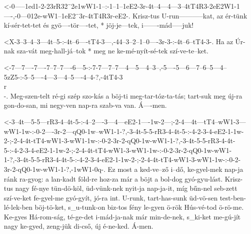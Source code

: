 



  {<-0-----1ed1-2-23rR32¨2e1wW1-1--:-1--1--1eE2-3r-4t--4---4---3--4tT4R3-2eE2W1-1----,-0---012e-wW1--1eE2¨3r-4tT4R3r-eE2-.}
  {  Krisz-tus  U-run-----------kat, az ér-tünk kí-sér-tet-tet és gyö----tör----tet, * jöj-je---tek, i-------mád-----juk!}

  {<X-3--3--4--3---4t--5-:-4t--6----tT4-3---,-44--3--2--1--0----3r-3-:-4t--6--tT4-3-.}
  {   Ha az Úr-nak sza-vát meg-hall-já--tok * meg ne ke-mé-nyít-sé-tek szí-ve-te--ket.}


  {<-7---7----7----7--7--7----6---5-:-7-7---7--7---4---5---4--3--,-5----5---6---7--6--5---4--5zZ5-:-5--5----4---3---4--5----4--4-?,-4tT4-3\\r\\-.}
  {  Meg-szen-telt ré-gi szép szo-kás a böj-ti meg-tar-tóz-ta-tás; tart-suk meg új-ra gon-do-san,   mi negy-ven nap-ra szab-va van. Á----men.}

  {<-3--4t---5-5---rR3-4--4t-5-:-4--2----3---4---eE2-1----1w-2---;-2-4---4t---tT4--wW1-3---wW1-1w-:-0-2----3r-2---qQ0-1w--wW1-1-?,-3-4t-5-5-rR3-4-4t-5-:-4-2-3-4-eE2-1-1w-2-;-2-4-4t-tT4-wW1-3-wW1-1w-:-0-2-3r-2-qQ0-1w-wW1-1-?,-3-4t-5-5-rR3-4-4t-5-:-4-2-3-4-eE2-1-1w-2-;-2-4-4t-tT4-wW1-3-wW1-1w-:-0-2-3r-2-qQ0-1w-wW1-1-?,-3-4t-5-5-rR3-4-4t-5-:-4-2-3-4-eE2-1-1w-2-;-2-4-4t-tT4-wW1-3-wW1-1w-:-0-2-3r-2-qQ0-1w-wW1-1-?,-1wW1-0q-.}
  {  Ez most a ked-ve--ző i--dő, ke-gyel-mek nap-ja  ránk ra-gyog: a lan-kadt föld-re  hoz-za  már  a böjt a  bol-dog gyó-gyu-lást. Krisz-tus nagy fé-nye tün-dö-köl, üd-vünk-nek nyit-ja nap-ja-it, míg bűn-nel seb-zett szí-ve-ket fe-gyel-me gyó-gyít, jó-ra int. U-runk, tart-has-sunk üd-vö-sen test-ben-lé-lek-ben böj-tö-ket, s_u-tunk-on biz-tos fény le-gyen ö-rök Hús-vé-tod ö-rö-me. Ke-gyes Há-rom-ság, té-ge-det i-mád-ja-nak már min-de-nek, s_ki-ket me-gú-jít nagy ke-gyed, zeng-jük di-cső, új é-ne-ked. Á-men.}


